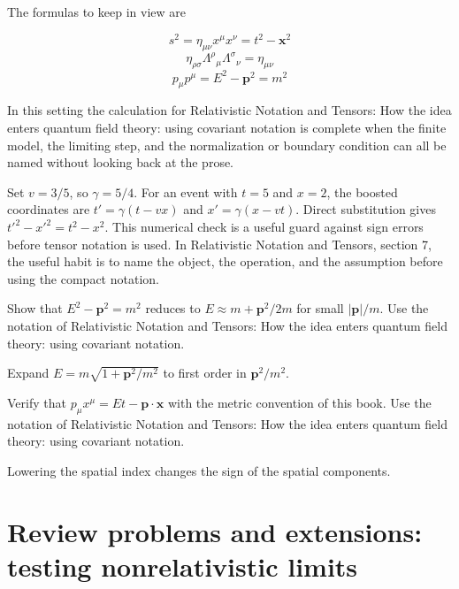 The formulas to keep in view are

\[
  s^2=\eta_{\mu\nu}x^\mu x^\nu=t^2-\bm x^2
\]
\[
  \eta_{\rho\sigma}\Lambda^\rho{}_\mu\Lambda^\sigma{}_\nu=\eta_{\mu\nu}
\]
\[
  p_\mu p^\mu=E^2-\bm p^2=m^2
\]

In this setting the calculation for Relativistic Notation and Tensors: How the idea enters quantum field theory: using covariant notation is complete when the finite model, the limiting step, and the normalization or boundary condition can all be named without looking back at the prose.




\begin{example}
Set \(v=3/5\), so \(\gamma=5/4\).  For an event with \(t=5\) and \(x=2\), the boosted coordinates are \(t'=\gamma(t-vx)\) and \(x'=\gamma(x-vt)\).  Direct substitution gives \(t'^2-x'^2=t^2-x^2\).  This numerical check is a useful guard against sign errors before tensor notation is used.  In Relativistic Notation and Tensors, section 7, the useful habit is to name the object, the operation, and the assumption before using the compact notation.
\end{example}



\begin{exercise}
Show that \(E^2-\bm p^2=m^2\) reduces to \(E\approx m+\bm p^2/2m\) for small \(|\bm p|/m\).  Use the notation of Relativistic Notation and Tensors: How the idea enters quantum field theory: using covariant notation.
\begin{answer}
Expand \(E=m\sqrt{1+\bm p^2/m^2}\) to first order in \(\bm p^2/m^2\).
\end{answer}
\end{exercise}

\begin{exercise}
Verify that \(p_\mu x^\mu=Et-\bm p\cdot\bm x\) with the metric convention of this book.  Use the notation of Relativistic Notation and Tensors: How the idea enters quantum field theory: using covariant notation.
\begin{answer}
Lowering the spatial index changes the sign of the spatial components.
\end{answer}
\end{exercise}



\section{Review problems and extensions: testing nonrelativistic limits}

